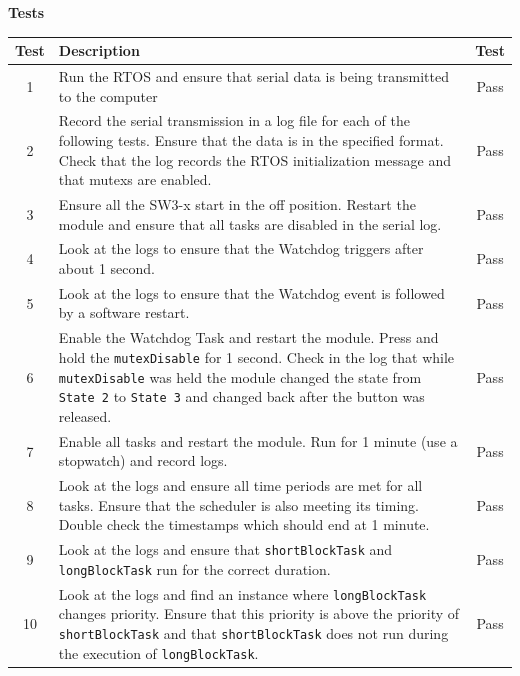 \documentclass{article}
\begin{document}
\begin{center}
    \textbf{Tests} \\
    \vspace{0.5em}
    \begin{tabular}{| c | p{35em} | c | }
    \hline
    \textbf{Test} & \textbf{Description} & \textbf{Test} \\ \hline
    1 & Run the RTOS and ensure that serial data is being transmitted to the computer & Pass \\ \hline
    2 & Record the serial transmission in a log file for each of the following tests. Ensure that the data is in the specified format. Check that the log records the RTOS initialization message and that mutexs are enabled. & Pass \\ \hline
    3 & Ensure all the SW3-x start in the off position. Restart the module and ensure that all tasks are disabled in the serial log. & Pass \\ \hline
    4 & Look at the logs to ensure that the Watchdog triggers after about 1 second. & Pass \\ \hline
    5 & Look at the logs to ensure that the Watchdog event is followed by a software restart. & Pass \\ \hline
    6 & Enable the Watchdog Task and restart the module. Press and hold the \texttt{mutexDisable} for 1 second. Check in the log that while \texttt{mutexDisable} was held the module changed the state from \texttt{State 2} to \texttt{State 3} and changed back after the button was released. & Pass \\ \hline
    7 & Enable all tasks and restart the module. Run for 1 minute (use a stopwatch) and record logs. & Pass \\ \hline
    8 & Look at the logs and ensure all time periods are met for all tasks. Ensure that the scheduler is also meeting its timing. Double check the timestamps which should end at 1 minute. & Pass \\ \hline
    9 & Look at the logs and ensure that \texttt{shortBlockTask} and \texttt{longBlockTask} run for the correct duration. & Pass \\ \hline
    10 & Look at the logs and find an instance where \texttt{longBlockTask} changes priority. Ensure that this priority is above the priority of \texttt{shortBlockTask} and that \texttt{shortBlockTask} does not run during the execution of \texttt{longBlockTask}. & Pass \\ \hline
    \end{tabular}
\end{center}
\end{document}
